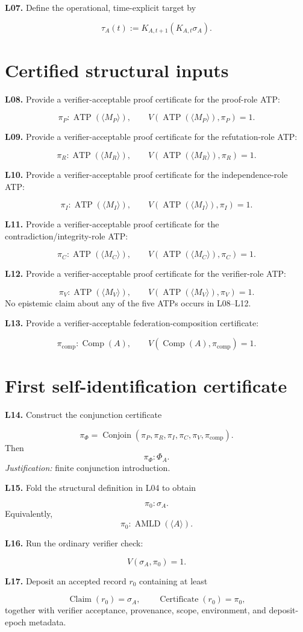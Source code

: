 \documentclass[11pt]{article}
\newcommand{\AMLD}{\operatorname{AMLD}}
\newcommand{\ATP}{\operatorname{ATP}}
\newcommand{\Comp}{\operatorname{Comp}}
\newcommand{\Claim}{\operatorname{Claim}}
\newcommand{\Certificate}{\operatorname{Certificate}}
\newcommand{\Conjoin}{\operatorname{Conjoin}}
\newcommand{\vcline}[2]{%
  \par\medskip
  \noindent\textbf{#1.} #2\par
}
\begin{document}
\vcline{L07}{Define the operational, time-explicit target by}
\[
\tau_A(t):=K_{A,t+1}(K_{A,t}\sigma_A).
\]

\section*{Certified structural inputs}

\vcline{L08}{Provide a verifier-acceptable proof certificate for the proof-role ATP:}
\[
\pi_P:\ATP(\langle M_P\rangle),
\qquad
V(\ATP(\langle M_P\rangle),\pi_P)=1.
\]

\vcline{L09}{Provide a verifier-acceptable proof certificate for the refutation-role ATP:}
\[
\pi_R:\ATP(\langle M_R\rangle),
\qquad
V(\ATP(\langle M_R\rangle),\pi_R)=1.
\]

\vcline{L10}{Provide a verifier-acceptable proof certificate for the independence-role ATP:}
\[
\pi_I:\ATP(\langle M_I\rangle),
\qquad
V(\ATP(\langle M_I\rangle),\pi_I)=1.
\]

\vcline{L11}{Provide a verifier-acceptable proof certificate for the contradiction/integrity-role ATP:}
\[
\pi_C:\ATP(\langle M_C\rangle),
\qquad
V(\ATP(\langle M_C\rangle),\pi_C)=1.
\]

\vcline{L12}{Provide a verifier-acceptable proof certificate for the verifier-role ATP:}
\[
\pi_V:\ATP(\langle M_V\rangle),
\qquad
V(\ATP(\langle M_V\rangle),\pi_V)=1.
\]
No epistemic claim about any of the five ATPs occurs in L08--L12.

\vcline{L13}{Provide a verifier-acceptable federation-composition certificate:}
\[
\pi_{\mathrm{comp}}:\Comp(A),
\qquad
V(\Comp(A),\pi_{\mathrm{comp}})=1.
\]

\section*{First self-identification certificate}

\vcline{L14}{Construct the conjunction certificate}
\[
\pi_\Phi
=
\Conjoin(\pi_P,\pi_R,\pi_I,\pi_C,\pi_V,\pi_{\mathrm{comp}}).
\]
Then
\[
\pi_\Phi:\Phi_A.
\]
\emph{Justification:} finite conjunction introduction.

\vcline{L15}{Fold the structural definition in L04 to obtain}
\[
\pi_0:\sigma_A.
\]
Equivalently,
\[
\pi_0:\AMLD(\langle A\rangle).
\]

\vcline{L16}{Run the ordinary verifier check:}
\[
V(\sigma_A,\pi_0)=1.
\]

\vcline{L17}{Deposit an accepted record $r_0$ containing at least}
\[
\Claim(r_0)=\sigma_A,
\qquad
\Certificate(r_0)=\pi_0,
\]
together with verifier acceptance, provenance, scope, environment, and deposit-epoch metadata.
\end{document}
